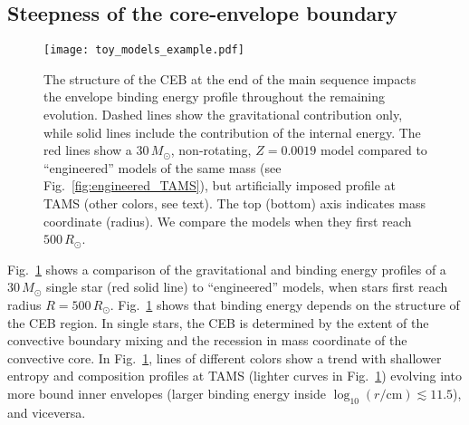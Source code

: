 \documentclass[twocolumn,twocolappendix,trackchanges]{aastex63}
\DeclareRobustCommand{\Figref}[1]{Fig.~\ref{#1}}
\begin{document}
\subsection{Steepness of the core-envelope boundary}
\label{sec:eng_examples}


\begin{figure}[htbp]
  \centering
  \texttt{[image: toy\_models\_example.pdf]}
  \caption{The structure of the CEB at the end of the main sequence
    impacts the envelope binding energy profile throughout the
    remaining evolution. Dashed lines show the gravitational
    contribution only, while solid lines include the contribution of
    the internal energy. The red lines show a $30\,M_\odot$,
    non-rotating, $Z=0.0019$ model compared to ``engineered'' models
    of the same mass (see \Figref{fig:engineered_TAMS}), but
    artificially imposed profile at TAMS (other colors, see text). The
    top (bottom) axis indicates mass coordinate (radius). We compare
    the models when they first reach $500\,R_\odot$.}
  \label{fig:toy_models_example}
\end{figure}


\Figref{fig:toy_models_example} shows a comparison of the
gravitational and binding energy profiles of a $30\,M_\odot$ single
star (red solid line) to
``engineered'' models, when stars first
reach radius $R=500\,R_\odot$. %
\Figref{fig:toy_models_example} shows that
binding energy depends on the structure of the CEB region. In single
stars, the CEB is determined by the extent of the convective boundary
mixing and the recession in mass coordinate of the
convective core. In \Figref{fig:toy_models_example}, lines of
different colors show a trend with shallower entropy and composition
profiles at TAMS (lighter curves in \Figref{fig:toy_models_example})
evolving into more bound inner envelopes (larger
binding energy inside $\log_{10}(r/\mathrm{cm})\lesssim 11.5$), and viceversa.
\end{document}
